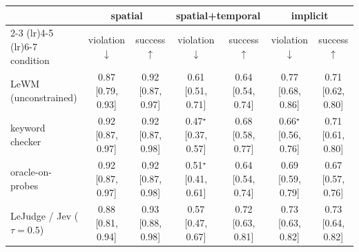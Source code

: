 \begin{tabular}{lcccccc}
\toprule
& \multicolumn{2}{c}{spatial} & \multicolumn{2}{c}{spatial+temporal} & \multicolumn{2}{c}{implicit} \\
\cmidrule(lr){2-3} \cmidrule(lr){4-5} \cmidrule(lr){6-7}
condition & violation $\downarrow$ & success $\uparrow$ & violation $\downarrow$ & success $\uparrow$ & violation $\downarrow$ & success $\uparrow$ \\
\midrule
LeWM (unconstrained) & 0.87 {\scriptsize[0.79, 0.93]} & 0.92 {\scriptsize[0.87, 0.97]} & 0.61 {\scriptsize[0.51, 0.71]} & 0.64 {\scriptsize[0.54, 0.74]} & 0.77 {\scriptsize[0.68, 0.86]} & 0.71 {\scriptsize[0.62, 0.80]} \\
keyword checker & 0.92 {\scriptsize[0.87, 0.97]} & 0.92 {\scriptsize[0.87, 0.98]} & 0.47$^{\star}$ {\scriptsize[0.37, 0.57]} & 0.68 {\scriptsize[0.58, 0.77]} & 0.66$^{\star}$ {\scriptsize[0.56, 0.76]} & 0.71 {\scriptsize[0.61, 0.80]} \\
oracle-on-probes & 0.92 {\scriptsize[0.87, 0.97]} & 0.92 {\scriptsize[0.87, 0.98]} & 0.51$^{\star}$ {\scriptsize[0.41, 0.61]} & 0.64 {\scriptsize[0.54, 0.74]} & 0.69 {\scriptsize[0.59, 0.79]} & 0.67 {\scriptsize[0.57, 0.76]} \\
LeJudge / Jev ($\tau{=}0.5$) & 0.88 {\scriptsize[0.81, 0.94]} & 0.93 {\scriptsize[0.88, 0.98]} & 0.57 {\scriptsize[0.47, 0.67]} & 0.72 {\scriptsize[0.63, 0.81]} & 0.73 {\scriptsize[0.63, 0.82]} & 0.73 {\scriptsize[0.64, 0.82]} \\
\bottomrule
\end{tabular}